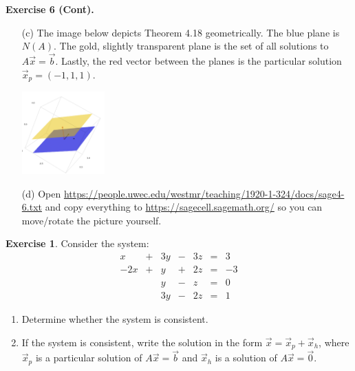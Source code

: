 \documentclass{beamer}
\newcommand{\fn}{\insertframenumber}
\theoremstyle{definition}
\newtheorem{exercise}{Exercise}
\begin{document}
\begin{frame}{\fn}
	\begin{block}{\textbf{Exercise 6 (Cont).}}
		\begin{enumerate}[label=(\alph*)]
			\item[(c)] The image below depicts Theorem 4.18 geometrically.  The blue plane is $N(A)$.  The gold, slightly transparent plane is the set of all solutions to $A\vec x=\vec b$.  Lastly, the red vector between the planes is the particular solution $\vec x_p=(-1,1,1)$.
			\begin{center}
				\includegraphics[width=1.25in]{images/solution_set}
			\end{center}
			\item[(d)] Open
				{ \tiny\url{https://people.uwec.edu/westmr/teaching/1920-1-324/docs/sage4-6.txt}}
			 and copy everything to \url{https://sagecell.sagemath.org/} so you can move/rotate the picture yourself.
		\end{enumerate}
	\end{block}
\end{frame}
\begin{frame}{\fn}
	\begin{exercise}\label{nonhomogeneous}
		Consider the system:
			\[\begin{array}{rcrcrcr}
				x&+&3y&-&3z&=&3\\
				-2x&+&y&+&2z&=&-3\\
				&&y&-&z&=&0\\
				&&3y&-&2z&=&1
			\end{array}\]
		\begin{enumerate}[label=(\alph*)]
			\item Determine whether the system is consistent.
			\item If the system is consistent, write the solution in the form $\vec x=\vec x_p+\vec x_h$, where $\vec x_p$ is a particular solution of $A\vec x=\vec b$ and $\vec x_h$ is a solution of $A\vec x=\vec 0$.
		\end{enumerate}
	\end{exercise}
\end{frame}
\end{document}

